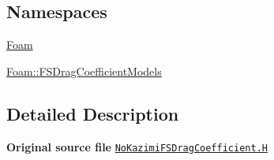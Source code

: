 \subsection*{Namespaces}
\begin{DoxyCompactItemize}
\item 
 \hyperlink{namespaceFoam}{Foam}
\item 
 \hyperlink{namespaceFoam_1_1FSDragCoefficientModels}{Foam\+::\+F\+S\+Drag\+Coefficient\+Models}
\end{DoxyCompactItemize}


\subsection{Detailed Description}
{\bfseries Original source file} \href{../../../home/carlo/data/GeN-Foam/GeN-Foam_ffn/GeN-Foam/GeN-Foam/classes/thermalHydraulics/src/physicsModels/dragModels/FSDragCoefficientModels/NoKazimi/NoKazimiFSDragCoefficient.H}{\tt No\+Kazimi\+F\+S\+Drag\+Coefficient.\+H} 